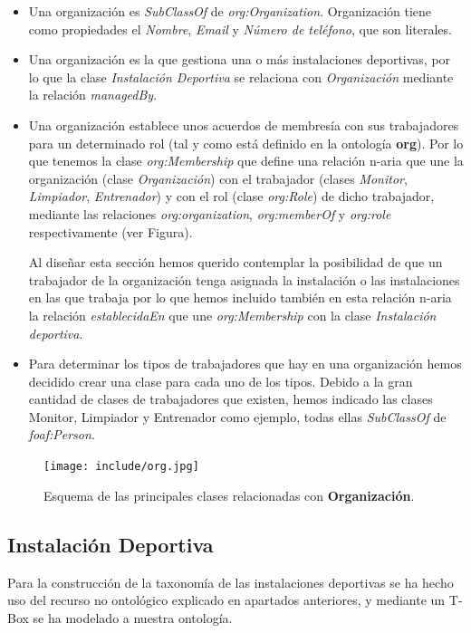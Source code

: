 \documentclass[a4paper,12pt]{article}
\begin{document}
	\begin{itemize}
		\item Una organización es \textit{SubClassOf} de \textit{org:Organization}. Organización tiene como propiedades el \textit{Nombre}, \textit{Email} y \textit{Número de teléfono}, que son literales.
		\item Una organización es la que gestiona una o más instalaciones deportivas, por lo que la clase \textit{Instalación Deportiva} se relaciona con \textit{Organización} mediante la relación \textit{managedBy}.
		
		\item Una organización establece unos acuerdos de membresía con sus trabajadores para un determinado rol (tal y como está definido en la ontología \textbf{org}). Por lo que tenemos la clase \textit{org:Membership} que define una relación n-aria que une la organización (clase \textit{Organización}) con el trabajador (clases \textit{Monitor}, \textit{Limpiador}, \textit{Entrenador}) y con el rol (clase \textit{org:Role}) de dicho trabajador, mediante las relaciones \textit{org:organization}, \textit{org:memberOf} y \textit{org:role} respectivamente (ver Figura). 
		
		Al diseñar esta sección hemos querido contemplar la posibilidad de que un trabajador de la organización tenga asignada la instalación o las instalaciones en las que trabaja por lo que hemos incluido también en esta relación n-aria la relación \textit{establecidaEn} que une \textit{org:Membership} con la clase \textit{Instalación deportiva}.
		\item Para determinar los tipos de trabajadores que hay en una organización hemos decidido crear una clase para cada uno de los tipos. Debido a la gran cantidad de clases de trabajadores que existen, hemos indicado las clases Monitor, Limpiador y Entrenador como ejemplo, todas ellas \textit{SubClassOf} de \textit{foaf:Person}.
	\end{itemize}

	\begin{figure}[H]
		\centering
		\texttt{[image: include/org.jpg]}
		\caption{Esquema de las principales clases relacionadas con \textbf{Organización}.}
	\end{figure}
	
	\subsection{Instalación Deportiva}
	
	Para la construcción de la taxonomía de las instalaciones deportivas se ha hecho uso del recurso no ontológico explicado en apartados anteriores, y mediante un T-Box se ha modelado a nuestra ontología.
	
\end{document}

